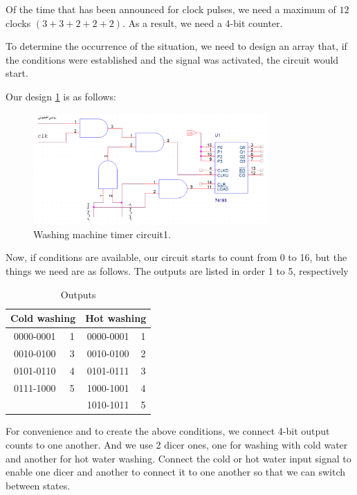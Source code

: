 \documentclass[12pt]{article}
\begin{document}
 Of the time that has been announced for clock pulses, we need a maximum of $12 $clocks $(3 + 3 + 2 + 2 + 2)$. As a result, we need a 4-bit counter.

 To determine the occurrence of the situation, we need to design an array that, if the conditions were established and the signal was activated, the circuit would start.

 Our design \ref{fig:Circuit1} is as follows:

 \begin{figure}[H]
\centering
\includegraphics[width=0.8\textwidth]{Circuit1}
\caption{\label{fig:Circuit1}Washing machine timer circuit1.}
\end{figure}

 Now, if conditions are available, our circuit starts to count from 0 to 16, but the things we need are as follows. The outputs are listed in order 1 to 5, respectively

 \begin{table}[H]
\caption{Outputs}
\centering
\begin{tabular}{|*{4}{c|}}
\hline
\multicolumn{2}{|c}{Cold washing} & \multicolumn{2}{|c|}{Hot washing} \\ \hline
0000-0001 & 1 & 0000-0001 & 1 \\
0010-0100 & 3 & 0010-0100 & 2  \\
0101-0110 &4 & 0101-0111 & 3 \\
0111-1000 & 5 &1000-1001 & 4 \\
  &   &1010-1011 & 5 \\
\hline
\end{tabular}
\end{table}

For convenience and to create the above conditions, we connect 4-bit output counts to one another. And we use 2 dicer ones, one for washing with cold water and another for hot water washing. Connect the cold or hot water input signal to enable one dicer and another to connect it to one another so that we can switch between states.
\end{document}
